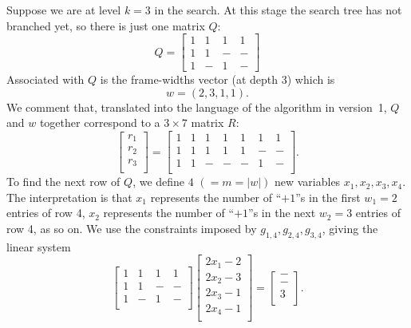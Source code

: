 \documentclass[11pt,a4paper]{article}
\newcommand{\ben}{\begin{equation*}}
\newcommand{\een}{\end{equation*}}
\begin{document}
Suppose we are at level $k=3$ in the search.  At this stage 
the search tree has not branched yet, so there is just one matrix $Q$:
\ben
Q =
\left [
\begin{matrix}
1 & 1& 1 & 1\\
1 & 1 & - & -\\
1 & - & 1 & -
\end{matrix}
\right ]
\een
Associated with $Q$ is the frame-widths vector (at depth $3$) which is 
\ben
w=(2,3,1,1).
\een
We comment that, translated into the language of the algorithm in version~1, $Q$ and $w$ together correspond to a $3 \times 7$ matrix $R$:
\[
\left[\begin{matrix}
r_1\\
r_2\\
r_3\\
\end{matrix}\right] =
\left[\begin{matrix}
1 & 1 & 1 & 1 & 1 & 1 & 1\\
1 & 1 & 1 & 1 & 1 & - & -\\
1 & 1 & - & - & - & 1 & -\\
\end{matrix}\right].
\]
To find the next row of $Q$, we define $4$ $(=m=|w|)$ new variables $x_1,
x_2, x_3, x_4$.  The interpretation is that $x_1$ represents the number of
``$+1$''s in the first $w_1=2$ entries of row 4, $x_2$ represents the number
of ``$+1$''s in the next $w_2=3$ entries of row 4, as so on.
We use the constraints imposed 
by $g_{1,4}, g_{2,4}, g_{3,4}$, giving the linear system
\begin{equation*}
\left[
\begin{matrix}
1 & 1 & 1 & 1\\
1 & 1 & - & -\\
1 & - & 1 & -\\
\end{matrix}
\right]
\left[
\begin{matrix}
2x_1 - 2\\
2x_2 - 3\\
2x_3 - 1\\
2x_4 - 1\\
\end{matrix}
\right] =
\left[
\begin{matrix}
-\\ - \\ 3\\
\end{matrix}
\right].
\end{equation*}
\end{document}
